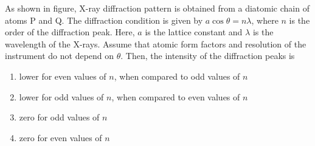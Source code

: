 \item As shown in figure, X-ray diffraction pattern is obtained from a diatomic chain of atoms P and Q. The diffraction condition is given by $a \cos{\theta} = n \lambda$, where $n$ is the order of the diffraction peak. Here, $a$ is the lattice constant and $\lambda$ is the wavelength of the X-rays. Assume that atomic form factors and resolution of the instrument do not depend on $\theta$. Then, the intensity of the diffraction peaks is
\centering
{}
\begin{multicols}{2}
    \begin{enumerate}
        \item lower for even values of $n$, when compared to odd values of $n$
        \item lower for odd values of $n$, when compared to even values of $n$
        \item zero for odd values of $n$
        \item zero for even values of $n$
    \end{enumerate}
\end{multicols}

